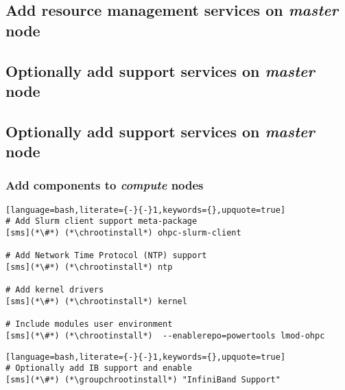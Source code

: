 \documentclass[letterpaper]{article}
\newcommand{\chrootinstall}{psh compute dnf -y install}
\newcommand{\groupchrootinstall}{psh compute dnf -y groupinstall}
\begin{document}
\subsection{Add resource management services on {\em master} node} \label{sec:add_rm}


\subsection{Optionally add \InfiniBand{} support services on {\em master} node} \label{sec:add_ofed}

\vspace*{0.3cm}
\subsection{Optionally add \OmniPath{} support services on {\em master} node} \label{sec:add_opa}


\clearpage
\subsubsection{Add \OHPC{} components to {\em compute} nodes} \label{sec:add_components}


\begin{lstlisting}[language=bash,literate={-}{-}1,keywords={},upquote=true]
# Add Slurm client support meta-package
[sms](*\#*) (*\chrootinstall*) ohpc-slurm-client

# Add Network Time Protocol (NTP) support
[sms](*\#*) (*\chrootinstall*) ntp

# Add kernel drivers
[sms](*\#*) (*\chrootinstall*) kernel

# Include modules user environment
[sms](*\#*) (*\chrootinstall*)  --enablerepo=powertools lmod-ohpc
\end{lstlisting}

\begin{lstlisting}[language=bash,literate={-}{-}1,keywords={},upquote=true]
# Optionally add IB support and enable
[sms](*\#*) (*\groupchrootinstall*) "InfiniBand Support"
\end{lstlisting}
\end{document}
